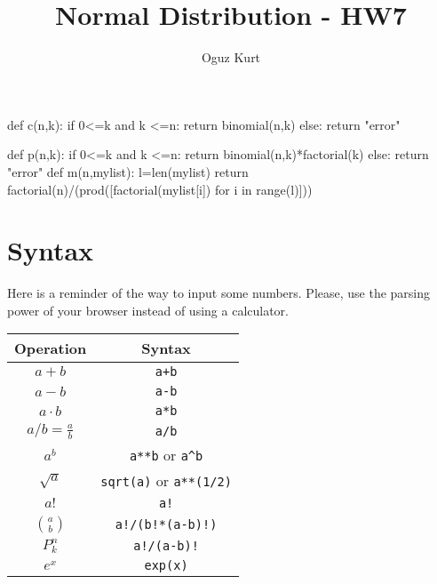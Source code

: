 \documentclass{ximera}
\title{Normal Distribution - HW7}
\author{Oguz Kurt}
\begin{document}
\begin{abstract}
\empty
\end{abstract}
\maketitle
\begin{sagesilent}
def c(n,k):
    if 0<=k and k <=n:
        return binomial(n,k)
    else:
        return "error"

def p(n,k):
    if 0<=k and k <=n:
        return binomial(n,k)*factorial(k)
    else:
        return "error"
def m(n,mylist):
    l=len(mylist)
    return factorial(n)/(prod([factorial(mylist[i]) for i in range(l)]))
\end{sagesilent}



\section*{Syntax}
Here is a reminder of the way to input some numbers. Please, use the parsing power of your browser instead of using a calculator.

\hspace{0.5cm}


\begin{tabular}{c|c}
Operation & Syntax  
\\
\hline
$a+b$ & {\color{red} \verb!a+b!} 
\\
\hline
$a- b$ & {\color{red} \verb!a-b!} 
\\
\hline
$a\cdot b$ & {\color{red} \verb!a*b! } 
\\
\hline
$a/b=\frac{a}{b}$ & {\color{red} \verb!a/b!}
\\
\hline
$a^b$ & {\color{red} \verb|a**b| or \verb|a^b|} 
\\
\hline
$\sqrt{a}$ & {\color{red} \verb|sqrt(a)| or \verb|a**(1/2)|} 
\\
\hline
$a!$ & {\color{red} \verb|a!|} 
\\
\hline
$\binom{a}{b}$ & {\color{red} \verb|a!/(b!*(a-b)!)|}
\\
\hline
$P_k^n$ & {\color{red} \verb|a!/(a-b)!|}
\\
\hline
$e^x$ & {\color{red} \verb|exp(x)|}
\\
\end{tabular}
\end{document}
